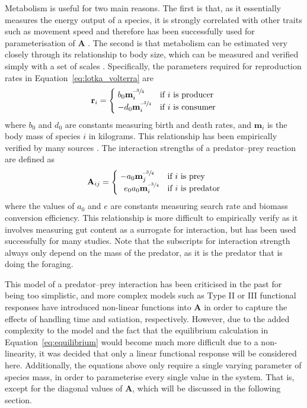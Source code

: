 Metabolism is useful for two main reasons. The first is that, as it essentially measures the energy output of a species, it is strongly correlated with other traits such as movement speed \cite{Hirt2017} and therefore has been successfully used for parameterisation of $\mathbf{A}$ \cite{Brosespeed, Brose, Pawar}. The second is that metabolism can be estimated very closely through its relationship to body size, which can be measured and verified simply with a set of scales \cite{Brose}.
Specifically, the parameters required for reproduction rates in Equation~\eqref{eq:lotka_volterra} are
\begin{equation}
  \mathbf{r}_i =
  \begin{cases}
    \;b_0\mathbf{m}_i^{\text{--}\sfrac{3}{4}} & \text{if $i$ is producer}\\
    \;-d_0\mathbf{m}_i^{\text{--}\sfrac{3}{4}} & \text{if $i$ is consumer}
  \end{cases}
\end{equation}
where $b_0$ and $d_0$ are constants measuring birth and death rates, and $\mathbf{m}_i$ is the body mass of species $i$ in kilograms. This relationship has been empirically verified by many sources \cite{Brose, Gillooly}.
The interaction strengths of a predator--prey reaction are defined as
\begin{equation}
  \mathbf{A}_{ij} =
  \begin{cases}
    \;-a_0\mathbf{m}_j^{\text{--}\sfrac{3}{4}} & \text{if $i$ is prey}\\
    \;\;\,e_0a_0\mathbf{m}_i^{\text{--}\sfrac{3}{4}} & \text{if $i$ is predator}
  \end{cases}
\end{equation}
where the values of $a_0$ and $e$ are constants measuring search rate and biomass conversion efficiency. This relationship is more difficult to empirically verify as it involves measuring gut content as a surrogate for interaction, but has been used successfully for many studies. Note that the subscripts for interaction strength always only depend on the mass of the predator, as it is the predator that is doing the foraging.

This model of a predator--prey interaction has been criticised in the past for being too simplistic, and more complex models such as Type II or III functional responses \cite{Holling1973} have introduced non-linear functions into $\mathbf{A}$ in order to capture the effects of handling time and satiation, respectively.
However, due to the added complexity to the model and the fact that the equilibrium calculation in Equation~\eqref{eq:equilibrium} would become much more difficult due to a non-linearity, it was decided that only a linear functional response will be considered here.
Additionally, the equations above only require a single varying parameter of species mass, in order to parameterise every single value in the system. That is, except for the diagonal values of $\mathbf{A}$, which will be discussed in the following section.

